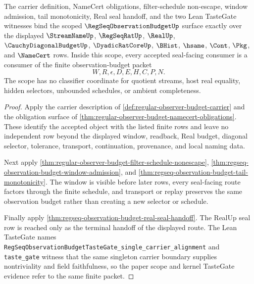 \begin{theorem}\label{thm:regseq-observation-budget-scoped-closure}
The carrier definition, NameCert obligations, filter-schedule non-escape, window admission, tail monotonicity, Real seal handoff, and the two Lean TasteGate witnesses bind the scoped $\RegSeqObservationBudgetUp$ surface exactly over the displayed $\StreamNameUp$, $\RegSeqRatUp$, $\RealUp$, $\CauchyDiagonalBudgetUp$, $\DyadicRatCoreUp$, $\BHist$, $\hsame$, $\Cont$, $\Pkg$, and $\NameCert$ rows. Inside this scope, every accepted seal-facing consumer is a consumer of the finite observation-budget packet
$$
W,R,\epsilon,D,E,H,C,P,N.
$$
The scope has no classifier coordinate for quotient streams, host real equality, hidden selectors, unbounded schedules, or ambient completeness.
\end{theorem}
\begin{proof}
Apply the carrier description of \autoref{def:regular-observer-budget-carrier} and the obligation surface of \autoref{thm:regular-observer-budget-namecert-obligations}. These identify the accepted object with the listed finite rows and leave no independent row beyond the displayed window, readback, Real budget, diagonal selector, tolerance, transport, continuation, provenance, and local naming data.

Next apply \autoref{thm:regular-observer-budget-filter-schedule-nonescape}, \autoref{thm:regseq-observation-budget-window-admission}, and \autoref{thm:regseq-observation-budget-tail-monotonicity}. The window is visible before later rows, every seal-facing route factors through the finite schedule, and transport or replay preserves the same observation budget rather than creating a new selector or schedule.

Finally apply \autoref{thm:regseq-observation-budget-real-seal-handoff}. The RealUp seal row is reached only as the terminal handoff of the displayed route. The Lean TasteGate names \texttt{RegSeqObservationBudgetTasteGate\_single\_carrier\_alignment} and \texttt{taste\_gate} witness that the same singleton carrier boundary supplies nontriviality and field faithfulness, so the paper scope and kernel TasteGate evidence refer to the same finite packet.
\end{proof}

